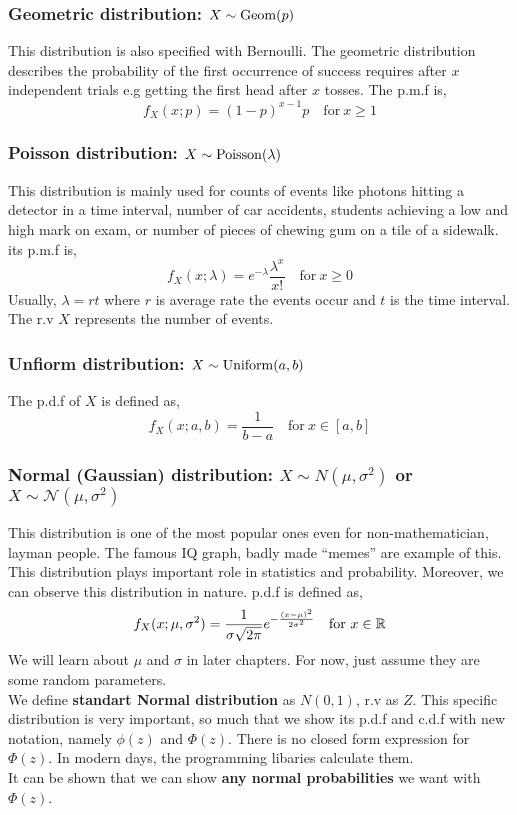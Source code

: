 \subsubsection*{Geometric distribution: $X \sim \operatorname{Geom}(p)$}
This distribution is also specified with Bernoulli. The geometric distribution describes the probability of the first occurrence of success requires after $x$ independent trials e.g getting the first head after $x$ tosses. The p.m.f is,
\[ f_{X}(x; p) = (1-p)^{x-1}p \quad \text{for} \ x \ge 1 \]
\subsubsection*{Poisson distribution: $X \sim \operatorname{Poisson}(\lambda)$}
This distribution is mainly used for counts of events like photons hitting a detector in a time interval, number of car accidents, students achieving a low and high mark on exam, or number of pieces of chewing gum on a tile of a sidewalk. its p.m.f is,
\[f_X(x; \lambda) = e^{-\lambda} \frac{\lambda^{x}}{x!} \quad \text{for} \ x \ge 0 \]
Usually, $\lambda = rt$ where $r$ is average rate the events occur and $t$ is the time interval. The r.v $X$ represents the number of events.
\subsubsection*{Unfiorm distribution: $X \sim \operatorname{Uniform}(a,b)$}
The p.d.f of $X$ is defined as,
\[f_X(x; a,b)= \frac{1}{b-a} \quad \text{for} \ x \in [a,b]\]
\subsubsection*{Normal (Gaussian) distribution: $X \sim N(\mu, \sigma^2)$ or $X \sim \mathcal{N}(\mu, \sigma^2)$}
This distribution is one of the most popular ones even for non-mathematician, layman people. The famous IQ graph, badly made ``memes'' are example of this. This distribution plays important role in statistics and probability. Moreover, we can observe this distribution in nature. p.d.f is defined as,
\[f_X(x; \mu, \sigma^2) = \frac{1}{\sigma \sqrt{2 \pi}}  e^{- \frac{(x- \mu)^2}{2\sigma^2}} \quad \text{for} \ x \in {\mathbb{R}} \]
We will learn about $\mu$ and $\sigma$ in later chapters. For now, just assume they are some random parameters. \\
We define  \textbf{standart Normal distribution} as $N(0,1)$, r.v as $Z$. This specific distribution is very important, so much that we show its p.d.f and c.d.f with new notation, namely $\phi(z)$ and $\Phi(z)$. There is no closed form expression for $\Phi(z)$. In modern days, the programming libaries calculate them. \\
It can be shown that we can show \textbf{any normal  probabilities} we want with $\Phi(z)$.
